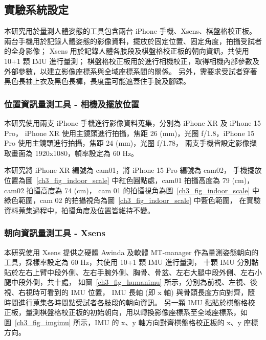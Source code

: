 \clearpage


\subsection{實驗系統設定}
本研究用於量測人體姿態的工具包含兩台 iPhone 手機、Xsens、棋盤格校正板。
兩台手機用於記錄人體姿態的影像資料，擺放於固定位置、固定角度，拍攝受試者的全身影像；
Xsens 用於記錄人體各肢段及棋盤格校正板的朝向資訊，共使用 10+1 顆 IMU 進行量測；
棋盤格校正板用於進行相機校正，取得相機內部參數及外部參數，以建立影像座標系與全域座標系間的關係。
另外，需要求受試者穿著黑色長袖上衣及黑色長褲，長度盡可能遮蓋住手腕及腳踝。


\subsubsection{位置資訊量測工具 - 相機及擺放位置}
本研究使用兩支 iPhone 手機進行影像資料蒐集，分別為 iPhone XR 及 iPhone 15 Pro，
iPhone XR 使用主鏡頭進行拍攝，焦距 26 (mm)，光圈 ƒ/1.8，iPhone 15 Pro 使用主鏡頭進行拍攝，焦距 24 (mm)，光圈 ƒ/1.78，
兩支手機皆設定影像擷取畫面為 1920x1080，幀率設定為 60 Hz。

本研究將 iPhone XR 編號為 cam01，將 iPhone 15 Pro 編號為 cam02，
手機擺放位置為圖~\ref{ch3_fig_indoor_scale} 中紅色圓點處，cam01 拍攝高度為 79 (cm)，cam02 拍攝高度為 74 (cm)，
cam 01 的拍攝視角為圖~\ref{ch3_fig_indoor_scale} 中綠色範圍，cam 02 的拍攝視角為圖~\ref{ch3_fig_indoor_scale} 中藍色範圍，
在實驗資料蒐集過程中，拍攝角度及位置皆維持不變。

\subsubsection{朝向資訊量測工具 - Xsens}
本研究使用 Xsens 提供之硬體 Awinda 及軟體 MT-manager 作為量測姿態朝向的工具，採樣率設定為 60 Hz，共使用 10+1 顆 IMU 進行量測，
十顆 IMU 分別黏貼於左右上臂中段外側、左右手腕外側、胸骨、骨盆、左右大腿中段外側、左右小腿中段外側，共十處，
如圖~\ref{ch3_fig_humanimu} 所示，分別為前視、左視、後視、右視時可看到的 IMU 位置， IMU 長軸 (即 x 軸) 與骨頭長度方向對齊，隨時間進行蒐集各時間點受試者各肢段的朝向資訊。
另一顆 IMU 黏貼於棋盤格校正板，量測棋盤格校正板的初始朝向，用以轉換影像座標系至全域座標系，如圖~\ref{ch3_fig_imgimu} 所示，IMU 的 x、y 軸方向對齊棋盤格校正板的 x、y 座標方向。

